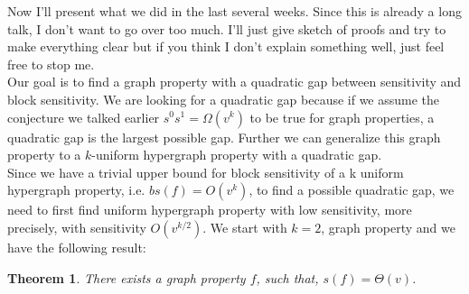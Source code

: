 \documentclass[psamsfonts]{amsart}
\newtheorem{theorem}{Theorem}[section]
\theoremstyle{definition}
\theoremstyle{remark}
\numberwithin{equation}{section}
\begin{document}
	Now I'll present what we did in the last several weeks. Since this is already a long talk, I don't want to go over too much. I'll just give sketch of proofs and try to make everything clear but if you think I don't explain something well, just feel free to stop me.\\ 
	\indent Our goal is to find a graph property with a quadratic gap between sensitivity and block sensitivity. We are looking for a quadratic gap because if we assume the conjecture we talked earlier $s^0s^1 = \Omega(v^k)$ to be true for graph properties, a quadratic gap is the largest possible gap. Further we can generalize this graph property to a $k$-uniform hypergraph property with a quadratic gap.\\
	\indent Since we have a trivial upper bound for block sensitivity of a k uniform hypergraph property, i.e. $bs(f) = O(v^k)$, to find a possible quadratic gap, we need to first find uniform hypergraph property with low sensitivity, more precisely, with sensitivity $O(v^{k/2})$. We start with $k=2$, graph property and we have the following result:
	\begin{theorem}
		There exists a graph property $f$, such that, $s(f) = \Theta(v)$.
	\end{theorem} 
\end{document}

